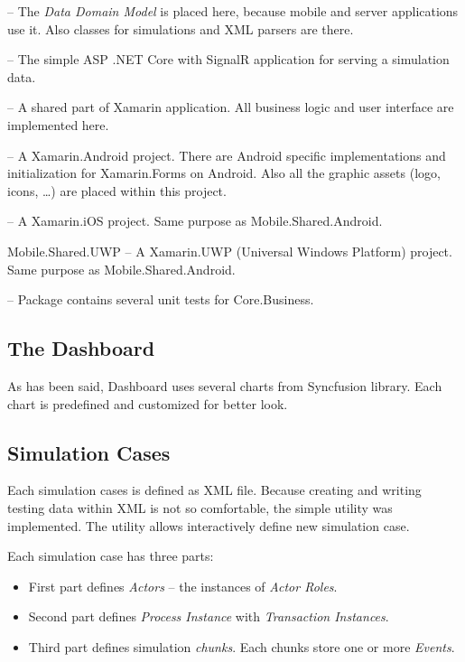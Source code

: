 \begin{description}
\item[Core.Business] -- The \textit{Data Domain Model} is placed here, because mobile and server applications use it. Also classes for simulations and XML parsers are there.
\item[Server] -- The simple ASP .NET Core with SignalR application for serving a simulation data.
\item[Mobile.Shared] -- A shared part of Xamarin application. All business logic and user interface are implemented here.
\item[Mobile.Shared.Android] -- A Xamarin.Android project. There are Android specific implementations and initialization for Xamarin.Forms on Android. Also all the graphic assets (logo, icons, \dots) are placed within this project.
\item[Mobile.Shared.iOS] -- A Xamarin.iOS project. Same purpose as Mobile.Shared.Android.
\item{Mobile.Shared.UWP} -- A Xamarin.UWP (Universal Windows Platform) project. Same purpose as Mobile.Shared.Android.
\item[Tests] -- Package contains several unit tests for Core.Business. 
\end{description}
\subsection{The Dashboard}
As has been said, Dashboard uses several charts from Syncfusion library. Each chart is predefined and customized for better look. 
\subsection{Simulation Cases}
Each simulation cases is defined as XML file. Because creating and writing testing data within XML is not so comfortable, the simple utility was implemented. The utility allows interactively define new simulation case.

Each simulation case has three parts:
\begin{itemize}
\item First part defines \textit{Actors} -- the instances of \textit{Actor Roles}.
\item Second part defines \textit{Process Instance} with \textit{Transaction Instances}.
\item Third part defines simulation \textit{chunks}. Each chunks store one or more \textit{Events}.
\end{itemize}

